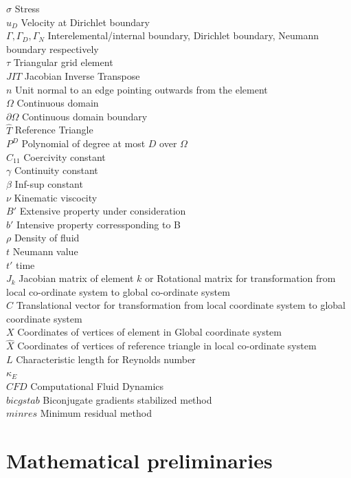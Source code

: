 \documentclass[a4paper,12pt]{book}
\begin{document}
$\sigma$ Stress\\
$u_D$ Velocity at Dirichlet boundary\\
$\Gamma, \Gamma_D, \Gamma_N$ Interelemental/internal boundary, Dirichlet boundary, Neumann boundary respectively\\
$\tau$ Triangular grid element\\
$JIT$ Jacobian Inverse Transpose\\
$n$ Unit normal to an edge pointing outwards from the element\\
$\Omega$ Continuous domain\\
$\partial \Omega$ Continuous domain boundary\\
$\hat{T}$ Reference Triangle\\
$P^D$ Polynomial of degree at most $D$ over $\Omega$\\
$C_{11}$ Coercivity constant\\
$\gamma$ Continuity constant\\
$\beta$ Inf-sup constant\\
$\nu$ Kinematic viscocity\\
$B'$ Extensive property under consideration  \\
$b'$ Intensive property corressponding to B \\
$\rho$ Density of fluid \\
$t$ Neumann value\\
$t'$ time\\
$J_k$ Jacobian matrix of element $k$ or Rotational matrix for transformation from local co-ordinate system to global co-ordinate system\\
$C$ Translational vector for transformation from local coordinate system to global coordinate system\\
$X$ Coordinates of vertices of element in Global coordinate system\\
$\hat{X}$ Coordinates of vertices of reference triangle in local co-ordinate system\\
$L$ Characteristic length for Reynolds number\\
$\kappa_E$\\
$CFD$ Computational Fluid Dynamics\\
$bicgstab$ Biconjugate gradients stabilized method\\
$minres$ Minimum residual method\\

\section{Mathematical preliminaries}
\end{document}

